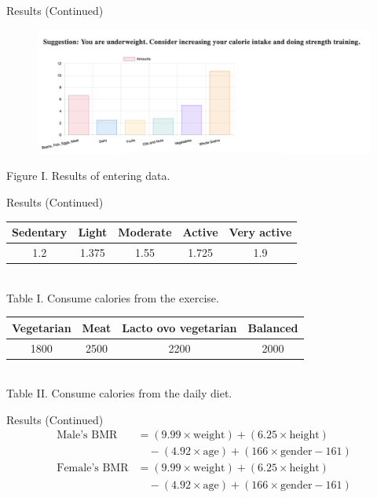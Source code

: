 \documentclass[fleqn]{beamer}
\begin{document}
\begin{frame}{Results (Continued)}
\begin{figure}[h]
    \centering
    \includegraphics[width=\textwidth]{Example.png}
\end{figure}
    \centering
    Figure I. Results of entering data.
\end{frame}
\begin{frame}{Results (Continued)}
\vspace{1.5cm}
\sloppy
{}
\renewcommand{\arraystretch}{1.5}
\centering
\begin{tabular}{|c|c|c|c|c|}
\hline
\textbf{Sedentary} & \textbf{Light} & \textbf{Moderate} & \textbf{Active} & \textbf{Very active} \\
\hline
1.2 & 1.375 & 1.55 & 1.725 & 1.9 \\
\hline
\end{tabular}
\vspace{0.5cm} 
\\
Table I. Consume calories from the exercise. 
\vspace{1cm} 
\\
\begin{tabular}{|c|c|c|c|}
\hline
\textbf{Vegetarian} & \textbf{Meat} & \textbf{Lacto ovo vegetarian} & \textbf{Balanced} \\
\hline
1800 & 2500 & 2200 & 2000 \\
\hline
\end{tabular}
\vspace{0.5cm} 
\\
Table II. Consume calories from the daily diet. 
\vspace{1cm} 
\\
\end{frame}
\begin{frame}{Results (Continued)}
\sloppy
{}
\begin{align*}
    \text{Male's BMR} &= (9.99 \times \text{weight}) + (6.25 \times \text{height}) \\
    &\quad - (4.92 \times \text{age}) + (166 \times \text{gender} - 161) \\
    \text{Female's BMR} &= (9.99 \times \text{weight}) + (6.25 \times \text{height}) \\
    &\quad - (4.92 \times \text{age}) + (166 \times \text{gender} - 161)
    \end{align*}
\end{frame}
\end{document}

